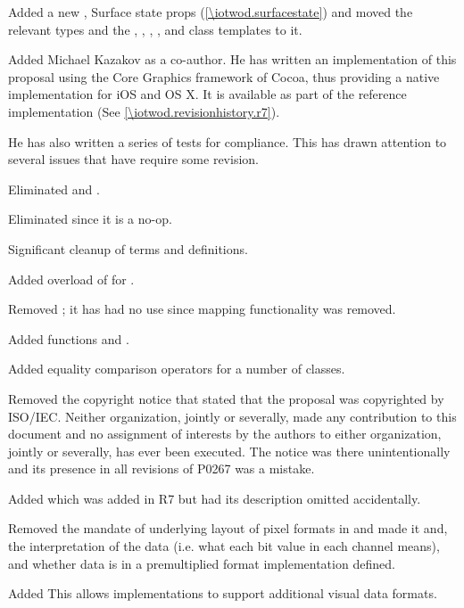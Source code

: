 \pnum
Added a new \clause, Surface state props (\ref{\iotwod.surfacestate}) and moved the relevant  types and the , , , , and  class templates to it. 

\pnum
Added Michael Kazakov as a co-author. He has written an implementation of this proposal using the Core Graphics framework of Cocoa\textregistered{}, thus providing a native implementation for iOS\textregistered{} and OS X\textregistered{}. It is available as part of the reference implementation (See \ref{\iotwod.revisionhistory.r7}).

\pnum
He has also written a series of tests for compliance. This has drawn attention to several issues that have require some revision.

\pnum
Eliminated  and .

\pnum
Eliminated  since it is a no-op.

\pnum
Significant cleanup of terms and definitions.

\pnum
Added overload of  for .

\pnum
Removed ; it has had no use since mapping functionality was removed.

\pnum
Added functions  and .

\pnum
Added equality comparison operators for a number of classes.

\pnum
Removed the copyright notice that stated that the proposal was copyrighted by ISO/IEC. Neither organization, jointly or severally, made any contribution to this document and no assignment of interests by the authors to either organization, jointly or severally, has ever been executed. The notice was there unintentionally and its presence in all revisions of P0267 was a mistake.

\pnum
Added  which was added in R7 but had its description omitted accidentally.

\pnum
Removed the mandate of underlying layout of pixel formats in  and made it and, the interpretation of the data (i.e. what each bit value in each channel means), and whether data is in a premultiplied format implementation defined.

\pnum
Added  This allows implementations to support additional visual data formats.

